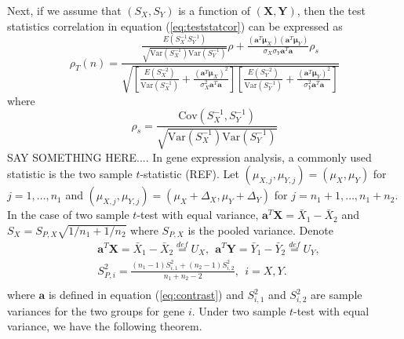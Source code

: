 \documentclass[12pt, a4paper]{article}
\newcommand{\cov}{\text{Cov}}
\newcommand{\var}{\text{Var}}
\begin{document}
	Next, if we assume that $(S_X, S_Y)$ is a function of $(\bm X, \bm Y)$, then the test statistics correlation in equation (\ref{eq:teststatcor}) can be expressed as  
	\begin{equation}
		\rho_T(n) = \frac{ \frac{E(S_X^{-1}S_Y^{-1})}
			{\sqrt{\var(S_X^{-1})\var(S_Y^{-1})}}\rho + \frac{(\bm a^T\bm \mu_X)(\bm a^T\bm \mu_Y)}{\sigma_X\sigma_Y\bm a^T\bm a} \rho_s	
		}{\sqrt{\left[ \frac{E(S_X^{-2})}{\var(S_X^{-1})} + \frac{(\bm a^T\bm \mu_X)^2}{\sigma_X^2\bm a^T\bm a}\right]\left[ \frac{E(S_Y^{-2})}{\var(S_Y^{-1})} + \frac{(\bm a^T\bm \mu_Y)^2}{\sigma_Y^2\bm a^T\bm a}\right]}} 
	\end{equation}
	where 
	\begin{equation}
	 \rho_s = \frac{\cov(S_X^{-1},S_Y^{-1})}{\sqrt{\var(S_X^{-1})\var(S_Y^{-1})}}
	\end{equation}
	SAY SOMETHING HERE....
	\newpage
	In gene expression analysis, a commonly used statistic is the two sample $t$-statistic (REF). Let $(\mu_{X,j}, \mu_{Y, j}) = (\mu_X, \mu_Y)$ 
	for $j = 1, \ldots, n_1$ and $(\mu_{X,j}, \mu_{Y, j}) = (\mu_X + \Delta_X, \mu_Y + \Delta_Y)$ for $j = n_1 + 1, \ldots, n_1 + n_2$. In the 
	case of two sample $t$-test with equal variance, $\bm a^T\bm X = \bar{X}_1 - \bar{X}_2$ and $S_X = S_{P, X}\sqrt{1/n_1 + 1/n_2}$ where 
	$S_{P,X}$ is the pooled variance. Denote  
	 \begin{equation}\label{eq:tstatform}
	 \begin{aligned}
	 &\bm a^T\bm X  = \bar{X}_1 - \bar{X}_2 \stackrel{def}{= }U_X, ~~\bm a^T\bm Y = \bar{Y}_1 -\bar{Y}_2 \stackrel{def}{=}U_Y, \\
	 &S_{P, i}^2 = \frac{(n_1-1)S_{i, 1}^2 + (n_2 -1)S_{i,2}^2}{n_1 + n_2 -2}, ~~i = X, Y. \\
	 \end{aligned}
	 \end{equation}
	where $\bm a$ is defined in equation (\ref{eq:contrast}) and $S_{i, 1}^2$ and $S_{i, 2}^2$ are sample variances for the two groups for gene $i$. Under two sample $t$-test with equal variance, we have the following theorem.
\end{document}
